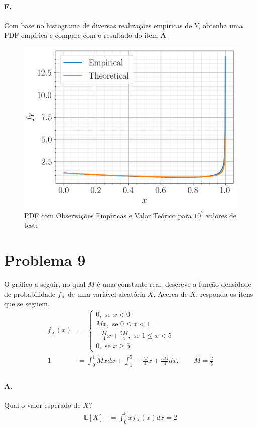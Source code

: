 \documentclass{article}
\begin{document}
\paragraph*{F.} Com base no histograma de diversas realizações empíricas de $Y$, obtenha uma PDF
empírica e compare com o resultado do item \textbf{A}
\begin{figure}[H]
    \centering
    \caption{PDF com Observações Empíricas e Valor Teórico para $10^7$ valores de teste}
    \includegraphics[width=0.8\linewidth]{py/8f.png}
\end{figure}

\section*{Problema 9}
O gráfico a seguir, no qual $M$ é uma constante real, descreve a função densidade de
probabilidade $f_X$ de uma variável aleatória $X$. Acerca de $X$, responda os itens que se
seguem.
\begin{align*}
    f_X(x) &=
    \begin{cases}
        0, \text{ se } x < 0 \\
        Mx, \text{ se } 0 \le x < 1 \\
        -\frac{M}{4}x + \frac{5M}{4}, \text{ se } 1 \le x < 5 \\
        0, \text{ se } x \ge 5
    \end{cases} \\
    1 &= \int_0^1 Mx dx + \int_1^5 -\frac{M}{4}x + \frac{5M}{4} dx, \qquad M = \frac{2}{5} \\
\end{align*}

\paragraph*{A.} Qual o valor esperado de $X$?
\begin{align*}
    \mathbb{E}[X] &= \int_0^5 x f_X(x) dx = 2
\end{align*}
\end{document}
